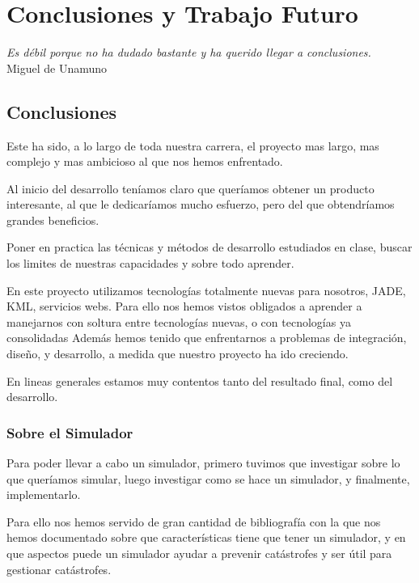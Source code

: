 \chapter*{Conclusiones y Trabajo Futuro} \label{cap7}

\begin{flushright}
\begin{minipage}{7.85cm}
    {\em Es débil porque no ha dudado bastante y ha querido llegar a
    conclusiones.} \\ Miguel de Unamuno
\end{minipage}
\end{flushright}

\vspace*{5mm}

\section*{Conclusiones}

Este ha sido, a lo largo de toda nuestra carrera, el proyecto mas largo, mas
complejo y mas ambicioso al que nos hemos enfrentado.

Al inicio del desarrollo teníamos claro que queríamos obtener un producto
interesante, al que le dedicaríamos mucho esfuerzo, pero del que obtendríamos
grandes beneficios.

Poner en practica las técnicas y métodos de desarrollo estudiados en clase,
buscar los limites de nuestras capacidades y sobre todo aprender.

En este proyecto utilizamos tecnologías totalmente nuevas para nosotros, JADE,
KML, servicios webs.
Para ello nos hemos vistos obligados a aprender a manejarnos con soltura entre
tecnologías nuevas, o con tecnologías ya consolidadas 
Además hemos tenido que enfrentarnos a problemas de integración, diseño, y
desarrollo, a medida que nuestro proyecto ha ido creciendo.

En lineas generales estamos muy contentos tanto del resultado final, como del
desarrollo.
\subsection*{Sobre el Simulador}
Para poder llevar a cabo un simulador, primero tuvimos que investigar sobre lo
que queríamos simular, luego investigar como se hace un simulador, y
finalmente, implementarlo.

Para ello nos hemos servido de gran cantidad de bibliografía con la que nos
hemos documentado sobre que características tiene que tener un simulador, y en
que aspectos puede un simulador ayudar a prevenir catástrofes y ser útil para
gestionar catástrofes.

